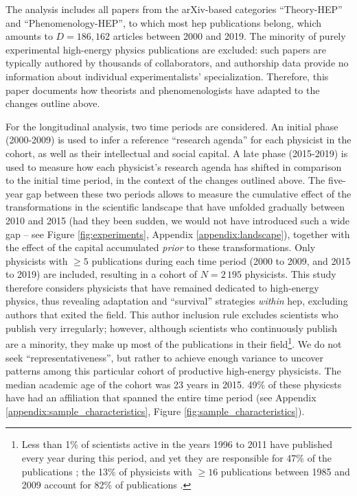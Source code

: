 \documentclass{article}
\begin{document}
The analysis includes all papers from the arXiv-based categories ``Theory-HEP'' and ``Phenomenology-HEP'', to which most \gls{hep} publications belong, which amounts to $D=186,162$ articles between 2000 and 2019. The minority of purely experimental high-energy physics publications are excluded: such papers are typically authored by thousands of collaborators, and authorship data provide no information about individual experimentalists' specialization. Therefore, this paper documents how theorists and phenomenologists have adapted to the changes outline above. 

For the longitudinal analysis, two time periods are considered. An initial phase (2000-2009) is used to infer a reference ``research agenda'' for each physicist in the cohort, as well as their intellectual and social capital. A late phase (2015-2019) is used to measure how each physicist's research agenda has shifted in comparison to the initial time period, in the context of the changes outlined above. The five-year gap between these two periods allows to measure the cumulative effect of the transformations in the scientific landscape that have unfolded gradually between 2010 and 2015 (had they been sudden, we would not have introduced such a wide gap -- see Figure \ref{fig:experiments}, Appendix \ref{appendix:landscape}), together with the effect of the capital accumulated \textit{prior} to these transformations. Only physicists with $\geq 5$ publications during each time period (2000 to 2009, and 2015 to 2019) are included, resulting in a cohort of $N=2\,195$ physicists. This study therefore considers physicists that have remained dedicated to high-energy physics, thus revealing adaptation and ``survival'' strategies \textit{within} \gls{hep}, excluding authors that exited the field. This author inclusion rule excludes scientists who publish very irregularly; however, although scientists who continuously publish are a minority, they make up most of the publications in their field\footnote{Less than 1\% of scientists active in the years 1996 to 2011 have published every year during this period, and yet they are responsible for 47\% of the publications \citep{Ioannidis2014}; the 13\% of physicists with $\geq 16$ publications between 1985 and 2009 account for 82\% of publications \citep{Feifan2023}.}. We do not seek ``representativeness'', but rather to achieve enough variance to uncover patterns among this particular cohort of productive high-energy physicists. The median academic age of the cohort was 23 years in 2015. 49\% of these physicsts have had an affiliation that spanned the entire time period (see Appendix \ref{appendix:sample_characteristics}, Figure \ref{fig:sample_characteristics}). 
\end{document}
